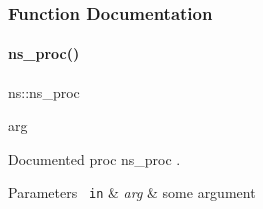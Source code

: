 \subsubsection{Function Documentation}
\mbox{\label{namespacens_a1429cbe84d32b17ea4783e5c5c00615b}} 
\paragraph{\texorpdfstring{ns\_proc()}{ns\_proc()}}
{\footnotesize\ttfamily ns\+::ns\+\_\+proc\begin{DoxyParamCaption}\item[{}]{arg  }\end{DoxyParamCaption}}



Documented proc {\ttfamily ns\+\_\+proc} . 


\begin{DoxyParams}[1]{Parameters}
\mbox{\texttt{ in}}  & {\em arg} & some argument \\
\hline
\end{DoxyParams}

\begin{DoxyCode}{0}

\end{DoxyCode}
